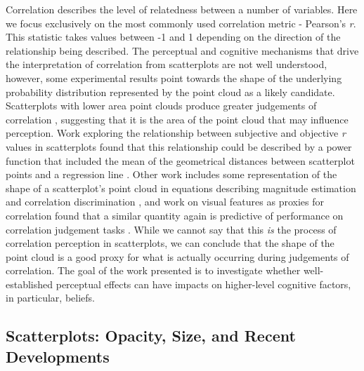 \documentclass[manuscript,screen,review,anonymous]{acmart}
\begin{document}
Correlation describes the level of relatedness between a number of
variables. Here we focus exclusively on the most commonly used
correlation metric - Pearson's \emph{r}. This statistic takes values
between -1 and 1 depending on the direction of the relationship being
described. The perceptual and cognitive mechanisms that drive the
interpretation of correlation from scatterplots are not well understood,
however, some experimental results point towards the shape of the
underlying probability distribution represented by the point cloud as a
likely candidate. Scatterplots with lower area point clouds produce
greater judgements of correlation \citep{cleveland_1982}, suggesting
that it is the area of the point cloud that may influence perception.
Work exploring the relationship between subjective and objective
\emph{r} values in scatterplots found that this relationship could be
described by a power function that included the mean of the geometrical
distances between scatterplot points and a regression line
\citep{meyer_1997}. Other work includes some representation of the shape
of a scatterplot's point cloud in equations describing magnitude
estimation and correlation discrimination
\citep{meyer_1997, rensink_2017}, and work on visual features as proxies
for correlation found that a similar quantity again is predictive of
performance on correlation judgement tasks \citep{yang_2019}. While we
cannot say that this \emph{is} the process of correlation perception in
scatterplots, we can conclude that the shape of the point cloud is a
good proxy for what is actually occurring during judgements of
correlation. The goal of the work presented is to investigate whether
well-established perceptual effects can have impacts on higher-level
cognitive factors, in particular, beliefs.

\subsection{Scatterplots: Opacity, Size, and Recent
Developments}\label{sec-scatterplots}
\end{document}
